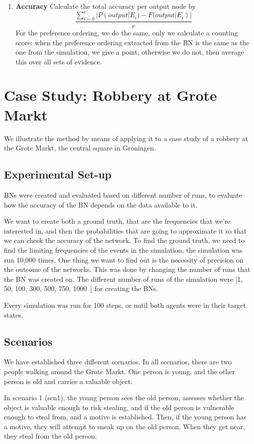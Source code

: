 \documentclass[12pt]{article}
\begin{document}
\begin{enumerate}
\item \textbf{Accuracy} Calculate the total accuracy per output node by \[\frac{\sum_{i=0}^{e}|P(output | E_i) - F(output| E_i)|}{e}\] For the preference ordering, we do the same, only we calculate a counting score: when the preference ordering extracted from the BN is the same as the one from the simulation, we give a point, otherwise we do not, then average this over all sets of evidence.
\end{enumerate}


\newpage


\section{Case Study: Robbery at Grote Markt}
We illustrate the method by means of applying it to a case study of a robbery at the Grote Markt, the central square in Groningen.

\subsection{Experimental Set-up}
BNs were created and evaluated based on different number of runs, to evaluate how the accuracy of the BN depends on the data available to it. 

We want to create both a ground truth, that are the frequencies that we're interested in, and then the probabilities that are going to approximate it so that we can check the accuracy of the network. To find the ground truth, we need to find the limiting frequencies of the events in the simulation, the simulation was run 10,000 times. One thing we want to find out is the necessity of precision on the outcome of the networks. This was done by changing the number of runs that the BN was created on. The different number of runs of the simulation were [1, 50, 100, 300, 500, 750, 1000~] for creating the BNs.


Every simulation was run for 100 steps, or until both agents were in their target states. 


\subsection{Scenarios}


We have established three different scenarios. In all scenarios, there are two people walking around the Grote Markt. One person is young, and the other person is old and carries a valuable object. 

In scenario 1 (scn1), the young person sees the old person, assesses whether the object is valuable enough to risk stealing, and if the old person is vulnerable enough to steal from, and a motive is established. Then, if the young person has a motive, they will attempt to sneak up on the old person. When they get near, they steal from the old person.
\end{document}
